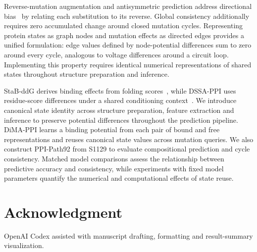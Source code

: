 \documentclass[conference,letterpaper]{IEEEtran}
\begin{document}
Reverse-mutation augmentation and antisymmetric prediction address
directional bias~\cite{ddgbias} by relating each substitution to its reverse.
Global consistency additionally requires zero accumulated change around
closed mutation cycles. Representing protein states as graph nodes and
mutation effects as directed edges provides a unified formulation: edge
values defined by node-potential differences sum to zero around every cycle,
analogous to voltage differences around a circuit loop. Implementing this
property requires identical numerical representations of shared states
throughout structure preparation and inference.

StaB-ddG derives binding effects from folding scores~\cite{stabddg}, while
DSSA-PPI uses residue-score differences under a shared conditioning
context~\cite{dssappi}. We introduce canonical state identity across
structure preparation, feature extraction and inference to preserve
potential differences throughout the prediction pipeline.
DiMA-PPI learns a binding potential from each pair of bound and free
representations and reuses canonical state values across mutation queries.
We also construct PPI-Path92 from S1129 to evaluate compositional prediction
and cycle consistency. Matched model comparisons assess the relationship
between predictive accuracy and consistency, while experiments with fixed
model parameters quantify the numerical and computational effects of state
reuse.



\section*{Acknowledgment}
OpenAI Codex assisted with manuscript drafting, formatting and result-summary
visualization.


\end{document}
